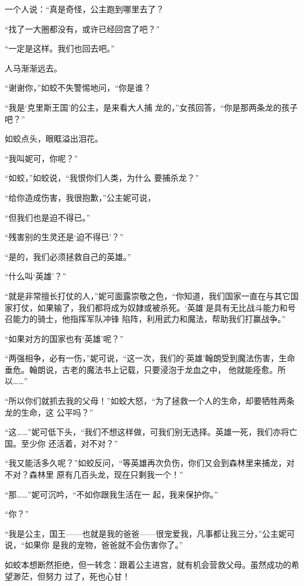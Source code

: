 \documentclass{article}
\begin{document}
\newpage

一个人说：“真是奇怪，公主跑到哪里去了？

“找了一大圈都没有，或许已经回宫了吧？”


“一定是这样。我们也回去吧。” 


人马渐渐远去。 

“谢谢你，”如蛟不失警惕地问，“你是谁？

“我是‘克里斯王国’的公主，是来看大人捕
龙的，”女孩回答，“你是那两条龙的孩子吧？” 


如蛟点头，眼眶溢出泪花。 


“我叫妮可，你呢？” 

“如蛟，”如蛟说，“我恨你们人类，为什么
要捕杀龙？” 

“给你造成伤害，我很抱歉，”公主妮可说，
\newpage

“但我们也是迫不得已。” 


“残害别的生灵还是‘迫不得已’？” 


“是的，我们必须拯救自己的英雄。” 


“什么叫‘英雄’？” 

“就是非常擅长打仗的人，”妮可面露崇敬之色，“你知道，我们国家一直在与其它国家打仗，如果输了，我们都将成为奴隷或被杀死。‘英雄’是具有无比战斗能力和号召能力的骑士，他指挥军队冲锋
陷阵，利用武力和魔法，帮助我们打赢战争。” 


“如果对方的国家也有‘英雄’呢？” 

“两强相争，必有一伤，”妮可说，“这一次，我们的‘英雄’翰朗受到魔法伤害，生命垂危。翰朗说，古老的魔法书上记载，只要浸泡于龙血之中，
他就能痊愈。所以……” 

\newpage

“所以你们就抓去我的父母！”如蛟大怒，“为了拯救一个人的生命，却要牺牲两条龙的生命，这
公平吗？” 

“这……”妮可低下头，“我们不想这样做，可我们别无选择。英雄一死，我们亦将亡国。至少你
还活着，对不对？” 

“我又能活多久呢？”如蛟反问，“等英雄再次负伤，你们又会到森林里来捕龙，对不对？森林里
原有几百头龙，现在只剩我一个！” 

“那……”妮可沉吟，“不如你跟我生活在一
起，我来保护你。” 


“你？” 

“我是公主，国王——也就是我的爸爸——很宠爱我，凡事都让我三分，”公主妮可说，“如果你
是我的宠物，爸爸就不会伤害你了。” 

\newpage

如蛟本想断然拒绝，但一转念：跟着公主进宫，就有机会营救父母。虽然成功的希望渺茫，但努力
过了，死也心甘！ 
\end{document}
